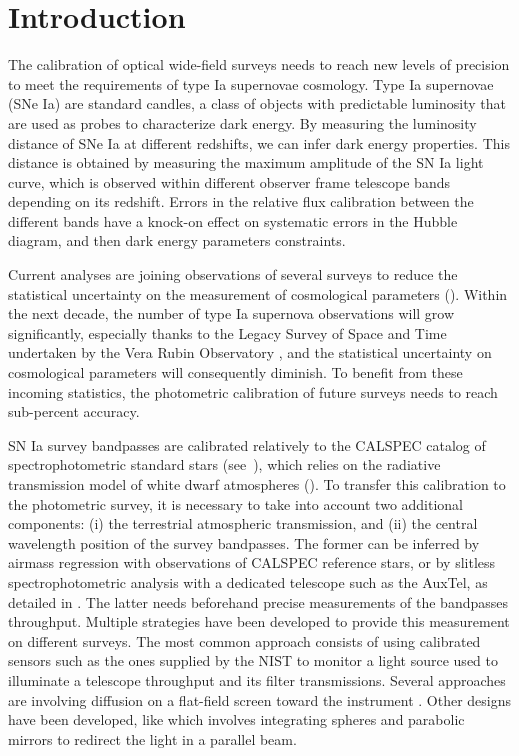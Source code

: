 \section{Introduction}

The calibration of optical wide-field surveys needs to reach new levels of precision to meet the requirements of type Ia supernovae cosmology. Type Ia supernovae (SNe Ia) are standard candles, a class of objects with predictable luminosity that are used as probes to characterize dark energy. By measuring the luminosity distance of SNe Ia at different redshifts, we can infer dark energy properties. This distance is obtained by measuring the maximum amplitude of the SN Ia light curve, which is observed within different observer frame telescope bands depending on its redshift. Errors in the relative flux calibration between the different bands have a knock-on effect on systematic errors in the Hubble diagram, and then dark energy parameters constraints.

Current analyses are joining observations of several surveys to reduce the statistical uncertainty on the measurement of cosmological parameters (\citealt{Betoule_2014,Scolnic_2018,Brout_2022,rubin2023union}). Within the next decade, the number of type Ia supernova observations will grow significantly, especially thanks to the Legacy Survey of Space and Time undertaken by the Vera Rubin Observatory  \citep{lsst}, and the statistical uncertainty on cosmological parameters will consequently diminish. To benefit from these incoming statistics, the photometric calibration of future surveys needs to reach sub-percent accuracy.

SN Ia survey bandpasses are calibrated relatively to the CALSPEC catalog of spectrophotometric standard stars (see~\cite{Bohlin_2020}), which relies on the radiative transmission model of white dwarf atmospheres (\cite{Narayan_2019}). To transfer this calibration to the photometric survey, it is necessary to take into account two additional components: (i) the terrestrial atmospheric transmission, and (ii) the central wavelength position of the survey bandpasses. The former can be inferred by airmass regression with observations of CALSPEC reference stars, or by slitless spectrophotometric analysis with a dedicated telescope such as the AuxTel, as detailed in \cite{Neveu_2024}. The latter needs beforehand precise measurements of the bandpasses throughput. Multiple strategies have been developed to provide this measurement on different surveys. The most common approach consists of using calibrated sensors such as the ones supplied by the NIST \citep{houston2008detectors} to monitor a light source used to illuminate a telescope throughput and its filter transmissions. Several approaches are involving diffusion on a flat-field screen toward the instrument \citep{stubbs2006,marshall2013}. Other designs have been developed, like \cite{Lombardo_2017} which involves integrating spheres and parabolic mirrors to redirect the light in a parallel beam.

